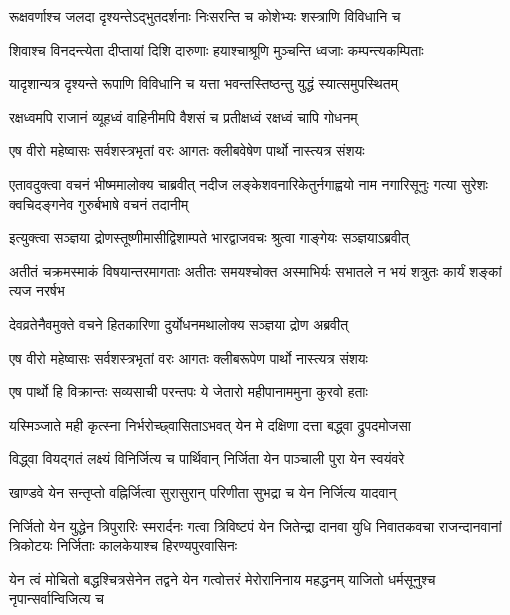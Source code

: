 \twolineshloka
{रूक्षवर्णाश्च जलदा दृश्यन्तेऽद्भुतदर्शनाः}
{निःसरन्ति च कोशेभ्यः शस्त्राणि विविधानि च}


\twolineshloka
{शिवाश्च विनदन्त्येता दीप्तायां दिशि दारुणाः}
{हयाश्चाश्रूणि मुञ्चन्ति ध्वजाः कम्पन्त्यकम्पिताः}


\twolineshloka
{यादृशान्यत्र दृश्यन्ते रूपाणि विविधानि च}
{यत्ता भवन्तस्तिष्ठन्तु युद्धं स्यात्समुपस्थितम्}


\twolineshloka
{रक्षध्वमपि राजानं व्यूहध्वं वाहिनीमपि}
{वैशसं च प्रतीक्षध्वं रक्षध्वं चापि गोधनम्}


\twolineshloka
{एष वीरो महेष्वासः सर्वशस्त्रभृतां वरः}
{आगतः क्लीबवेषेण पार्थो नास्त्यत्र संशयः}


\onelineshloka
{एतावदुक्त्वा वचनं भीष्ममालोक्य चाब्रवीत्}
\twolineshloka
{नदीज लङ्केशवनारिकेतुर्नगाह्वयो नाम नगारिसूनुः}
{गत्या सुरेशः क्वचिदङ्गनेव गुरुर्बभाषे वचनं तदानीम्}



\twolineshloka
{इत्युक्त्वा सञ्ज्ञया द्रोणस्तूष्णीमासीद्विशाम्पते}
{भारद्वाजवचः श्रुत्वा गाङ्गेयः सञ्ज्ञयाऽब्रवीत्}


\threelineshloka
{अतीतं चक्रमस्माकं विषयान्तरमागताः}
{अतीतः समयश्चोक्त अस्माभिर्यः सभातले}
{न भयं शत्रुतः कार्यं शङ्कां त्यज नरर्षभ}


\twolineshloka
{देवव्रतेनैवमुक्ते वचने हितकारिणा}
{दुर्योधनमथालोक्य सञ्ज्ञया द्रोण अब्रवीत्}


\twolineshloka
{एष वीरो महेष्वासः सर्वशस्त्रभृतां वरः}
{आगतः क्लीबरूपेण पार्थो नास्त्यत्र संशयः}


\twolineshloka
{एष पार्थो हि विक्रान्तः सव्यसाची परन्तपः}
{ये जेतारो महीपानाममुना कुरवो हताः}


\twolineshloka
{यस्मिञ्जाते मही कृत्स्ना निर्भरोच्छ्वासिताऽभवत्}
{येन मे दक्षिणा दत्ता बद्ध्वा द्रुपदमोजसा}


\twolineshloka
{विद्ध्वा वियद्गतं लक्ष्यं विनिर्जित्य च पार्थिवान्}
{निर्जिता येन पाञ्चाली पुरा येन स्वयंवरे}


\twolineshloka
{खाण्डवे येन सन्तृप्तो वह्निर्जित्वा सुरासुरान्}
{परिणीता सुभद्रा च येन निर्जित्य यादवान्}


\onelineshloka
{निर्जितो येन युद्धेन त्रिपुरारिः स्मरार्दनः}
\threelineshloka
{गत्वा त्रिविष्टपं येन जितेन्द्रा दानवा युधि}
{निवातकवचा राजन्दानवानां त्रिकोटयः}
{निर्जिताः कालकेयाश्च हिरण्यपुरवासिनः}


\onelineshloka
{येन त्वं मोचितो बद्धश्चित्रसेनेन तद्वने}
\twolineshloka
{येन गत्वोत्तरं मेरोरानिनाय महद्धनम्}
{याजितो धर्मसूनुश्च नृपान्सर्वान्विजित्य च}


